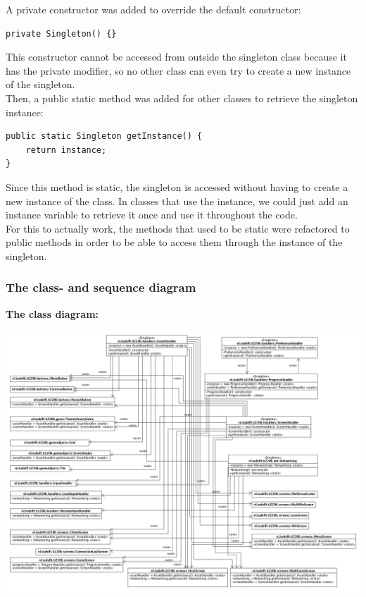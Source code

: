 \documentclass[a4paper,11pt,report]{scrartcl}
\begin{document}
A private constructor was added to override the default constructor:
\begin{verbatim}
private Singleton() {}
\end{verbatim}
This constructor cannot be accessed from outside the singleton class because it
has the private modifier, so no other class can even try to create a new
instance of the singleton.\\

Then, a public static method was added for other classes to retrieve the
singleton instance:
\begin{verbatim}
public static Singleton getInstance() {
    return instance;  
}
\end{verbatim}
Since this method is static, the singleton is accessed without having to create
a new instance of the class. In classes that use the instance, we could just
add an instance variable to retrieve it once and use it throughout the code.\\

For this to actually work, the methods that used to be static were refactored
to public methods in order to be able to access them through the instance of
the singleton.

\subsubsection{The class- and sequence diagram}
\textbf{The class diagram:}\\
\centerline{\includegraphics[scale=0.3]{sources/SingletonUML}}
\end{document}
